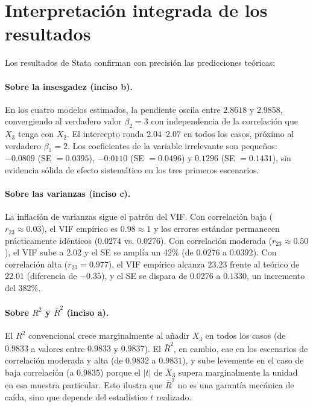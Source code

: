\documentclass[12pt, letterpaper]{article}
\begin{document}
\section{Interpretación integrada de los resultados}

Los resultados de Stata confirman con precisión las predicciones teóricas:

\paragraph{Sobre la insesgadez (inciso b).}
En los cuatro modelos estimados, la pendiente oscila entre $2.8618$ y
$2.9858$, convergiendo al verdadero valor $\beta_2 = 3$ con independencia
de la correlación que $X_3$ tenga con $X_2$. El intercepto ronda $2.04$--$2.07$
en todos los casos, próximo al verdadero $\beta_1 = 2$. Los coeficientes de
la variable irrelevante son pequeños: $-0.0809$ (SE $= 0.0395$),
$-0.0110$ (SE $= 0.0496$) y $0.1296$ (SE $= 0.1431$), sin evidencia sólida
de efecto sistemático en los tres primeros escenarios.

\paragraph{Sobre las varianzas (inciso c).}
La inflación de varianzas sigue el patrón del VIF. Con correlación baja
($r_{23} \approx 0.03$), el VIF empírico es $0.98 \approx 1$ y los errores
estándar permanecen prácticamente idénticos ($0.0274$ vs. $0.0276$). Con
correlación moderada ($r_{23} \approx 0.50$), el VIF sube a $2.02$ y el SE
se amplía un 42\% (de $0.0276$ a $0.0392$). Con correlación alta
($r_{23} = 0.977$), el VIF empírico alcanza $23.23$ frente al teórico de
$22.01$ (diferencia de $-0.35$), y el SE se dispara de $0.0276$ a $0.1330$,
un incremento del 382\%.

\paragraph{Sobre $R^2$ y $\bar{R}^2$ (inciso a).}
El $R^2$ convencional crece marginalmente al añadir $X_3$ en todos los
casos (de $0.9833$ a valores entre $0.9833$ y $0.9837$). El $\bar{R}^2$,
en cambio, cae en los escenarios de correlación moderada y alta (de
$0.9832$ a $0.9831$), y sube levemente en el caso de baja correlación
(a $0.9835$) porque el $|t|$ de $X_3$ supera marginalmente la unidad en
esa muestra particular. Esto ilustra que $\bar{R}^2$ no es una garantía
mecánica de caída, sino que depende del estadístico $t$ realizado.
\end{document}
